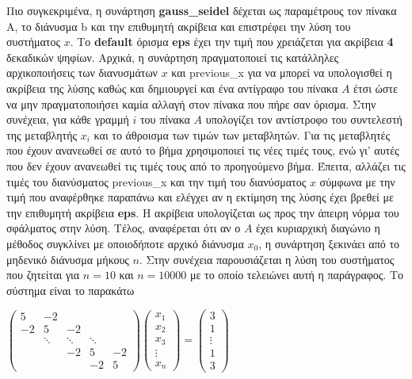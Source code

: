 \documentclass[First Project.tex]{subfiles}
\begin{document}
Πιο συγκεκριμένα, η συνάρτηση \textlatin{\textbf{gauss\_seidel}} δέχεται ως παραμέτρους τον πίνακα \textlatin{A}, το διάνυσμα \textlatin{b} και
την επιθυμητή ακρίβεια και επιστρέφει την λύση του συστήματος $x$. Το \textlatin{\textbf{default}} όρισμα \textlatin{\textbf{eps}} έχει την 
τιμή που χρειάζεται για ακρίβεια \textbf{4} δεκαδικών ψηφίων. Αρχικά, η συνάρτηση πραγματοποιεί τις κατάλληλες αρχικοποιήσεις των διανυσμάτων
$x$ και \textlatin{previous\_x} για να μπορεί να υπολογισθεί η ακρίβεια της λύσης καθώς και δημιουργεί και ένα αντίγραφο του πίνακα $Α$ έτσι ώστε να μην
πραγματοποιήσει καμία αλλαγή στον πίνακα που πήρε σαν όρισμα. Στην συνέχεια, για κάθε γραμμή $i$ του πίνακα $Α$ υπολογίζει τον αντίστροφο του
συντελεστή της μεταβλητής $x_{i}$ και το άθροισμα των τιμών των μεταβλητών. Για τις μεταβλητές που έχουν ανανεωθεί σε αυτό το βήμα 
χρησιμοποιεί τις νέες τιμές τους, ενώ γι' αυτές που δεν έχουν ανανεωθεί τις τιμές τους από το προηγούμενο βήμα. Έπειτα, αλλάζει τις τιμές του
διανύσματος \textlatin{previous\_x} και την τιμή του διανύσματος $x$ σύμφωνα με την τιμή που αναφέρθηκε παραπάνω και ελέγχει αν η εκτίμηση της λύσης 
έχει βρεθεί με την επιθυμητή ακρίβεια \textlatin{\textbf{eps}}. Η ακρίβεια υπολογίζεται ως προς την άπειρη νόρμα του σφάλματος στην λύση.
Τέλος, αναφέρεται ότι αν ο $Α$ έχει κυριαρχική διαγώνιο η μέθοδος συγκλίνει με οποιοδήποτε αρχικό διάνυσμα $x_{0}$, η συνάρτηση ξεκινάει από
το μηδενικό διάνυσμα μήκους $n$. Στην συνέχεια παρουσιάζεται η λύση του συστήματος που ζητείται για $n=10$ και $n=10000$ με το οποίο τελειώνει 
αυτή η παράγραφος. Το σύστημα είναι το παρακάτω 
\begin{center}
    $ \begin{pmatrix}
        5 & -2 &  &  &  \\
        -2 & 5 & -2 &  &  \\
         & \ddots & \ddots & \ddots &  \\
         &  & -2 & 5 & -2 \\
         &  &  & -2 & 5
    \end{pmatrix} 
    \begin{pmatrix}
        x_{1} \\
        x_{2} \\
        x_{3} \\
        \vdots \\
        x_{n}
    \end{pmatrix} = 
    \begin{pmatrix}
        3 \\
        1 \\
        \vdots \\
        1 \\
        3
    \end{pmatrix}$
\end{center} 
\end{document}
